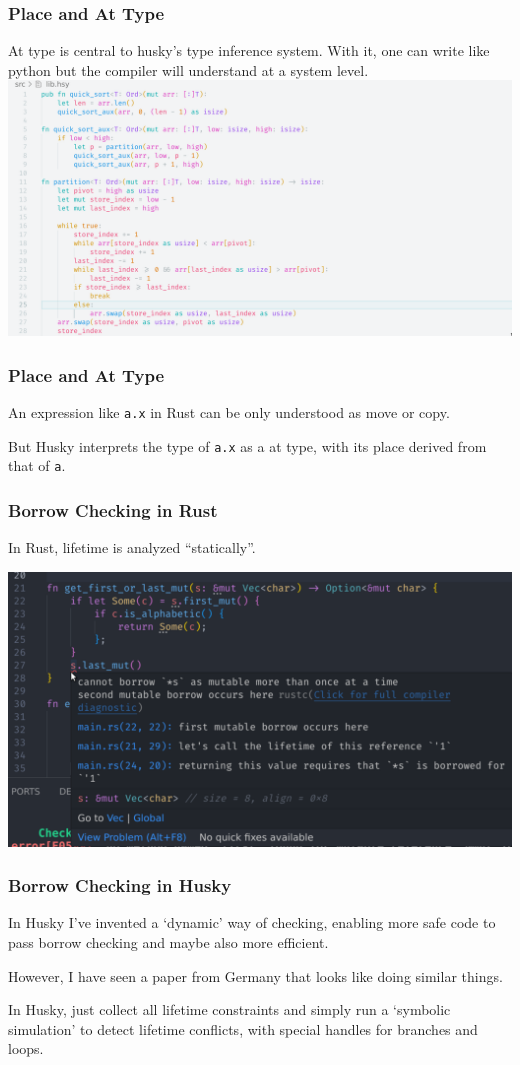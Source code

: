 \documentclass{beamer}   	%
\theoremstyle{definition}
\newcommand{\rust}[1]{\texttt{#1}}
\newcommand{\husky}[1]{\texttt{#1}}
\begin{document}
\begin{frame}
\frametitle{Place and At Type}
At type is central to husky's type inference system. With it, one can write like python but the compiler will understand at a system level.
\includegraphics[width=\linewidth]{snapshots/husky_quick_sort.png}
\end{frame}

\begin{frame}
\frametitle{Place and At Type}
An expression like \rust{a.x} in Rust can be only understood as move or copy.

But Husky interprets the type of \husky{a.x} as a at type, with its place derived from that of \husky{a}.
\end{frame}

\begin{frame}
\frametitle{Borrow Checking in Rust}
In Rust, lifetime is analyzed ``statically''. 

\includegraphics[width=\linewidth]{snapshots/get_first_or_last_mut.png}
\end{frame}

\begin{frame}
\frametitle{Borrow Checking in Husky}
In Husky I've invented a `dynamic' way of checking, enabling more safe code to pass borrow checking and maybe also more efficient.

{\color{gray}However, I have seen a paper from Germany that looks like doing similar things.}

In Husky, just collect all lifetime constraints and simply run a `symbolic simulation' to detect lifetime conflicts, with special handles for branches and loops.
\end{frame}
\end{document}
